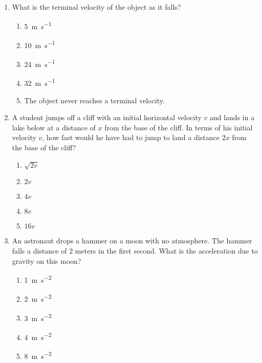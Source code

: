 \documentclass{../../../oss-apphys}
\begin{document}
\begin{multicols}{2}
\begin{enumerate}[resume,leftmargin=18pt]
  \item What is the terminal velocity of the object as it falls?
    \begin{enumerate}[noitemsep,topsep=0pt,leftmargin=18pt,label=(\Alph*)]
    \item \SI{5 }{\metre\per\second}
    \item \SI{10}{\metre\per\second}
    \item \SI{24}{\metre\per\second}
    \item \SI{32}{\metre\per\second}
    \item The object never reaches a terminal velocity.
    \end{enumerate}
    \label{q:fall2}
    
  \item A student jumps off a cliff with an initial horizontal velocity $v$ and
    lands in a lake below at a distance of $x$ from the base of the cliff. In
    terms of his initial velocity $v$, how fast would he have had to jump to
    land a distance $2x$ from the base of the cliff?
    \begin{center}
    \end{center}
    \begin{enumerate}[noitemsep,topsep=0pt,leftmargin=18pt,label=(\Alph*)]
    \item $\sqrt{2v}$
    \item $2v$
    \item $4v$
    \item $8v$
    \item $16v$
    \end{enumerate}
    \columnbreak
    
  \item An astronaut drops a hammer on a moon with no atmosphere. The hammer
    falls a distance of $2$ meters in the first second. What is the
    acceleration due to gravity on this moon?
    \begin{enumerate}[noitemsep,topsep=0pt,leftmargin=18pt,label=(\Alph*)]
    \item\SI{1}{\metre\per\second^2}
    \item\SI{2}{\metre\per\second^2}
    \item\SI{3}{\metre\per\second^2}
    \item\SI{4}{\metre\per\second^2}
    \item\SI{8}{\metre\per\second^2}
    \end{enumerate}


\end{enumerate}
\end{multicols}
\end{document}

